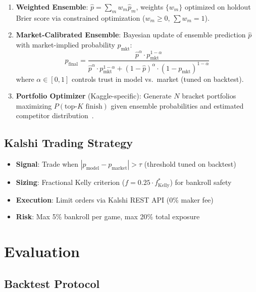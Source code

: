 \documentclass[11pt,a4paper]{article}
\begin{document}
\begin{enumerate}[nosep, start=7]
    \item \textbf{Weighted Ensemble}: $\hat{p} = \sum_m w_m \hat{p}_m$, weights $\{w_m\}$ optimized on holdout Brier score via constrained optimization ($w_m \geq 0$, $\sum w_m = 1$).

    \item \textbf{Market-Calibrated Ensemble}: Bayesian update of ensemble prediction $\hat{p}$ with market-implied probability $p_{\text{mkt}}$:
    \begin{equation}
        p_{\text{final}} = \frac{\hat{p}^{\alpha} \cdot p_{\text{mkt}}^{1-\alpha}}{\hat{p}^{\alpha} \cdot p_{\text{mkt}}^{1-\alpha} + (1-\hat{p})^{\alpha} \cdot (1-p_{\text{mkt}})^{1-\alpha}}
    \end{equation}
    where $\alpha \in [0,1]$ controls trust in model vs.\ market (tuned on backtest).

    \item \textbf{Portfolio Optimizer} (Kaggle-specific): Generate $N$ bracket portfolios maximizing $P(\text{top-}K \text{ finish})$ given ensemble probabilities and estimated competitor distribution~\citep{landgraf2017}.
\end{enumerate}

\subsection{Kalshi Trading Strategy}

\begin{itemize}[nosep]
    \item \textbf{Signal}: Trade when $|p_{\text{model}} - p_{\text{market}}| > \tau$ (threshold tuned on backtest)
    \item \textbf{Sizing}: Fractional Kelly criterion ($f = 0.25 \cdot f^*_{\text{Kelly}}$) for bankroll safety
    \item \textbf{Execution}: Limit orders via Kalshi REST API (0\% maker fee)
    \item \textbf{Risk}: Max 5\% bankroll per game, max 20\% total exposure
\end{itemize}

\section{Evaluation}

\subsection{Backtest Protocol}
\end{document}
